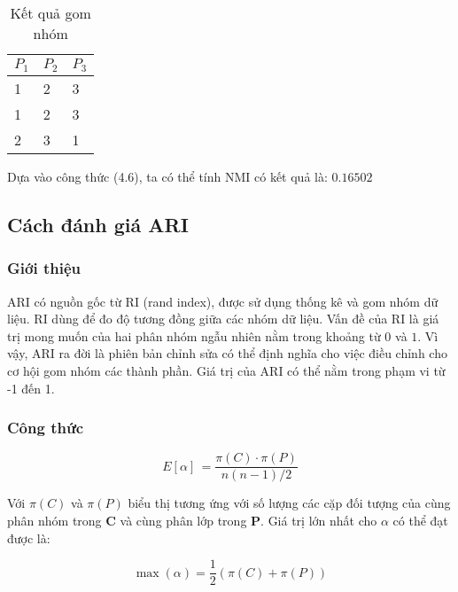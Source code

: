 \begin{table}[ht]
\begin{center}
\begin{tabularx}{\textwidth}{|Y|Y|Y|}
\hline
$P_1$ & $P_2$ & $P_3$\\
 & 2 & 3\\

1 & 2 & 3\\

2 & 3 & 1\\
\hline
\end{tabularx}
\caption[Kết quả gom nhóm]{Kết quả gom nhóm}
\label{bang_4_4}
\end{center}
\end{table}

Dựa vào công thức (4.6), ta có thể tính NMI có kết quả là: $0.16502$

		
\subsection{Cách đánh giá ARI}
\subsubsection{Giới thiệu}
ARI có nguồn gốc từ RI (rand index), được sử dụng thống kê và gom nhóm dữ liệu.
RI dùng để đo độ tương đồng giữa các nhóm dữ liệu.
Vấn đề của RI là giá trị mong muốn của hai phân nhóm ngẫu nhiên nằm trong khoảng từ $0$ và $1$.
Vì vậy, ARI ra đời là phiên bản chỉnh sửa có thể định nghĩa cho việc điều chỉnh cho cơ hội gom nhóm các thành phần.
Giá trị của ARI có thể nằm trong phạm vi từ -1 đến 1.

\subsubsection{Công thức}
\begin{center}
\begin{equation}
E[\alpha] \, = \frac{\pi(C) \cdot \pi(P)}{n(n - 1) / 2}
\end{equation}
\end{center}
		
Với $\pi(C)$ và $\pi(P)$ biểu thị tương ứng với số lượng các cặp đối tượng của cùng phân nhóm trong $\textbf{C}$ và cùng phân lớp trong $\textbf{P}$. Giá trị lớn nhất cho $\alpha$ có thể đạt được là:
\begin{center}
\begin{equation}
\max(\alpha) = \frac{1}{2} (\pi(C) + \pi(P))
\end{equation}
\end{center}
		
